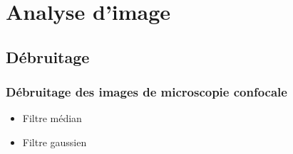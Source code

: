 \documentclass{beamer}
\begin{document}
  
\section{Analyse d'image}
  
  \subsection{Débruitage}
    
    \frame
    {
      \frametitle{Débruitage des images de microscopie confocale}
      \begin{itemize}
        \item<2-> Filtre médian
        \item<3-> Filtre gaussien
      \end{itemize}
      \begin{center}
      \end{center}
    }
    
\end{document}
